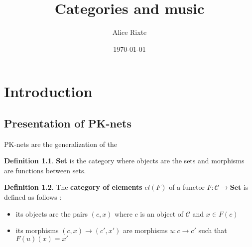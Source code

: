 \documentclass{report}
\theoremstyle{plain}
\theoremstyle{definition}
\newtheorem{defn}{Definition}[section]
\theoremstyle{remark}
\begin{document}
\title{Categories and music}
\author{Alice Rixte}
\date{\today}
\maketitle %


\chapter{Introduction}
\section{Presentation of PK-nets}
PK-nets\cite{PAAE2016} are the generalization of the 
\begin{defn}\textbf{Set} is the category where objects are the sets and morphisms are functions between sets.\end{defn}


\begin{figure}[h]
    \centering
    \label{PK-net definition}
\end{figure}



\begin{defn} The \textbf{category of elements} $el(F)$ of a functor $F : \mathcal{C}\rightarrow \textbf{Set}$ is defined as follows :
    \begin{itemize}
        \item its objects are the pairs $(c,x)$ where $c$ is an object of $\mathcal{C}$ and $x\in F(c)$
        \item its morphisms $(c,x)\rightarrow (c',x')$ are morphisms $u : c\rightarrow c'$ such that $F(u)(x) = x'$
    \end{itemize}



\end{defn}
\end{document}
